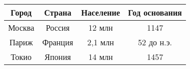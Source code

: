 \documentclass{article}
\begin{document}
\begin{table}[h]
\centering
\begin{tabular}{|c|c|c|c|}
\hline
Город & Страна & Население & Год основания \\
\hline
Москва & Россия & 12 млн & 1147 \\
\hline
Париж & Франция & 2,1 млн & 52 до н.э. \\
\hline
Токио & Япония & 14 млн & 1457 \\
\hline
\end{tabular}
\end{table}
\end{document}
